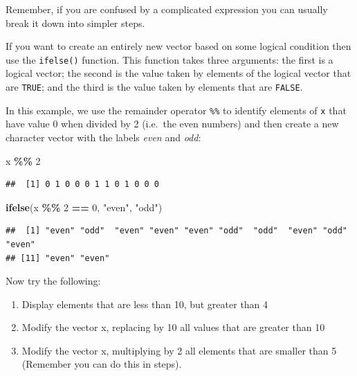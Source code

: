 \documentclass[
]{book}
\newenvironment{Shaded}{\begin{snugshade}}{\end{snugshade}}
\newcommand{\DecValTok}[1]{\textcolor[rgb]{0.00,0.00,0.81}{#1}}
\newcommand{\FunctionTok}[1]{\textcolor[rgb]{0.13,0.29,0.53}{\textbf{#1}}}
\newcommand{\NormalTok}[1]{#1}
\newcommand{\SpecialCharTok}[1]{\textcolor[rgb]{0.81,0.36,0.00}{\textbf{#1}}}
\newcommand{\StringTok}[1]{\textcolor[rgb]{0.31,0.60,0.02}{#1}}
\providecommand{\tightlist}{%
  \setlength{\itemsep}{0pt}\setlength{\parskip}{0pt}}
\theoremstyle{definition}
\theoremstyle{definition}
\theoremstyle{definition}
\theoremstyle{definition}
\theoremstyle{remark}
\begin{document}
Remember, if you are confused by a complicated expression you can usually
break it down into simpler steps.

If you want to create an entirely new vector based on some logical
condition then use the \texttt{ifelse()} function. This function takes
three arguments: the first is a logical vector; the second is the
value taken by elements of the logical vector that are \texttt{TRUE}; and
the third is the value taken by elements that are \texttt{FALSE}.

In this example, we use the remainder operator \texttt{\%\%} to identify
elements of \texttt{x} that have value 0 when divided by 2 (i.e.~the even numbers)
and then create a new character vector with the labels \emph{even} and \emph{odd}:

\begin{Shaded}
\begin{Highlighting}[]
\NormalTok{x }\SpecialCharTok{\%\%} \DecValTok{2}
\end{Highlighting}
\end{Shaded}

\begin{verbatim}
##  [1] 0 1 0 0 0 1 1 0 1 0 0 0
\end{verbatim}

\begin{Shaded}
\begin{Highlighting}[]
\FunctionTok{ifelse}\NormalTok{(x }\SpecialCharTok{\%\%} \DecValTok{2} \SpecialCharTok{==} \DecValTok{0}\NormalTok{, }\StringTok{"even"}\NormalTok{, }\StringTok{"odd"}\NormalTok{)}
\end{Highlighting}
\end{Shaded}

\begin{verbatim}
##  [1] "even" "odd"  "even" "even" "even" "odd"  "odd"  "even" "odd"  "even"
## [11] "even" "even"
\end{verbatim}

Now try the following:

\begin{enumerate}
\def\labelenumi{\arabic{enumi}.}
\tightlist
\item
  Display elements that are less than 10, but greater than 4
\item
  Modify the vector x, replacing by 10 all values that are greater than 10
\item
  Modify the vector x, multiplying by 2 all elements that are smaller than 5 (Remember you can do this in steps).
\end{enumerate}
\end{document}
